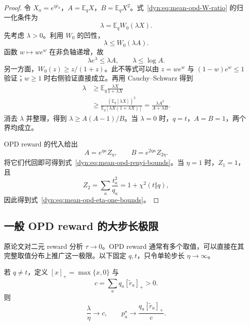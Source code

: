 \documentclass[lang=cn,scheme=chinese,openany]{../book/elegantbook}
\newcommand{\E}{\mathbb E}
\begin{document}
\begin{proof}
令 $X_a=e^{\eta \widetilde r_a}$，$A=\E_qX$，$B=\E_qX^2$。式~\eqref{dyn:eq:mean-opd-W-ratio} 的归一化条件为
\begin{equation*}
 \lambda=\E_qW_0(\lambda X).
\end{equation*}
先考虑 $\lambda>0$。利用 $W_0$ 的凹性，
\begin{equation*}
 \lambda\le W_0(\lambda A).
\end{equation*}
函数 $w\mapsto we^w$ 在非负轴递增，故
\begin{equation*}
 \lambda e^\lambda\le\lambda A,
 \qquad \lambda\le\log A.
\end{equation*}
另一方面，$W_0(z)\ge z/(1+z)$。此不等式可以由 $z=we^w$ 与 $(1-w)e^w\le1$ 验证；$w\ge1$ 时右侧验证直接成立。再用 Cauchy--Schwarz 得到
\begin{align*}
 \lambda
 &\ge\E_q\frac{\lambda X}{1+\lambda X}\\
 &\ge\frac{(\E_q[\lambda X])^2}
            {\E_q[\lambda X(1+\lambda X)]}
 =\frac{\lambda A^2}{A+\lambda B}.
\end{align*}
消去 $\lambda$ 并整理，得到 $\lambda\ge A(A-1)/B$。当 $\lambda=0$ 时，$q=t$，$A=B=1$，两个界均成立。

OPD reward 的代入给出
\begin{equation*}
 A=e^{\eta\kappa}Z_\eta,
 \qquad B=e^{2\eta\kappa}Z_{2\eta}.
\end{equation*}
将它们代回即可得到式~\eqref{dyn:eq:mean-opd-renyi-bounds}。当 $\eta=1$ 时，$Z_1=1$，且
\begin{equation*}
 Z_2=\sum_a\frac{t_a^2}{q_a}=1+\chi^2(t\Vert q),
\end{equation*}
因此得到式~\eqref{dyn:eq:mean-opd-eta-one-bounds}。
\end{proof}

\subsection{一般 OPD reward 的大步长极限}

原论文对二元 reward 分析 $\tau\to0$。OPD reward 通常有多个取值，可以直接在其完整取值分布上推广这一极限。以下固定 $q,t$，只令单轮步长 $\eta\to\infty$。

\begin{proposition}
\label{dyn:prop:mean-opd-large-eta}
若 $q\ne t$，定义 $[x]_+=\max\{x,0\}$ 与
\begin{equation*}
 c=\sum_aq_a[\widetilde r_a]_+>0.
\end{equation*}
则
\begin{equation}
 \frac{\lambda}{\eta}\longrightarrow c,
 \qquad
 p_a^\star\longrightarrow\frac{q_a[\widetilde r_a]_+}{c}.
 \label{dyn:eq:mean-opd-large-eta}
\end{equation}
\end{proposition}
\end{document}

